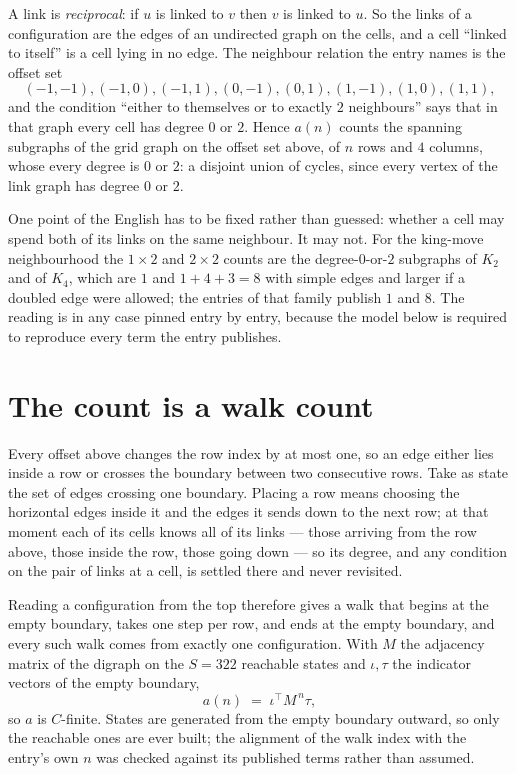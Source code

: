 \documentclass[11pt,a4paper]{article}
\theoremstyle{plain}
\theoremstyle{definition}
\begin{document}
A link is \emph{reciprocal}: if $u$ is linked to $v$ then $v$ is linked to $u$. So the links
of a configuration are the edges of an undirected graph on the cells, and a cell ``linked to
itself'' is a cell lying in no edge. The neighbour relation the entry names is the offset set
\[
(-1,-1), (-1,0), (-1,1), (0,-1), (0,1), (1,-1), (1,0), (1,1),
\]
and the condition ``either to themselves or to exactly $2$ neighbours'' says that in that
graph every cell has degree $0$ or $2$. Hence $a(n)$ counts the spanning subgraphs of the
grid graph on the offset set above, of $n$ rows and $4$ columns,
whose every degree is $0$ or $2$: a disjoint union of cycles, since every vertex of the link graph has degree $0$ or $2$.

One point of the English has to be fixed rather than guessed: whether a cell may spend both of
its links on the same neighbour. It may not. For the king-move neighbourhood the $1\times2$
and $2\times2$ counts are the degree-$0$-or-$2$ subgraphs of $K_2$ and of $K_4$, which are $1$
and $1+4+3=8$ with simple edges and larger if a doubled edge were allowed; the entries of that
family publish $1$ and $8$. The reading is in any case pinned entry by entry, because the
model below is required to reproduce every term the entry publishes.


\section{The count is a walk count}

Every offset above changes the row index by at most one, so an edge either lies inside a row
or crosses the boundary between two consecutive rows. Take as state the set of edges crossing
one boundary. Placing a row means choosing the horizontal edges inside it and the edges it
sends down to the next row; at that moment each of its cells knows all of its links --- those
arriving from the row above, those inside the row, those going down --- so its degree, and any
condition on the pair of links at a cell, is settled there and never revisited.

Reading a configuration from the top therefore gives a walk that begins at the empty boundary,
takes one step per row, and ends at the empty boundary, and every such walk comes from exactly
one configuration. With $M$ the adjacency matrix of the digraph on the $S=322$ reachable
states and $\iota,\tau$ the indicator vectors of the empty boundary,
\[
a(n)\;=\;\iota^{\!\top}M^{\,n}\tau ,
\]
so $a$ is $C$-finite. States are generated from the empty boundary outward, so only the
reachable ones are ever built; the alignment of the walk index with the entry's own $n$ was
checked against its published terms rather than assumed.
\end{document}
